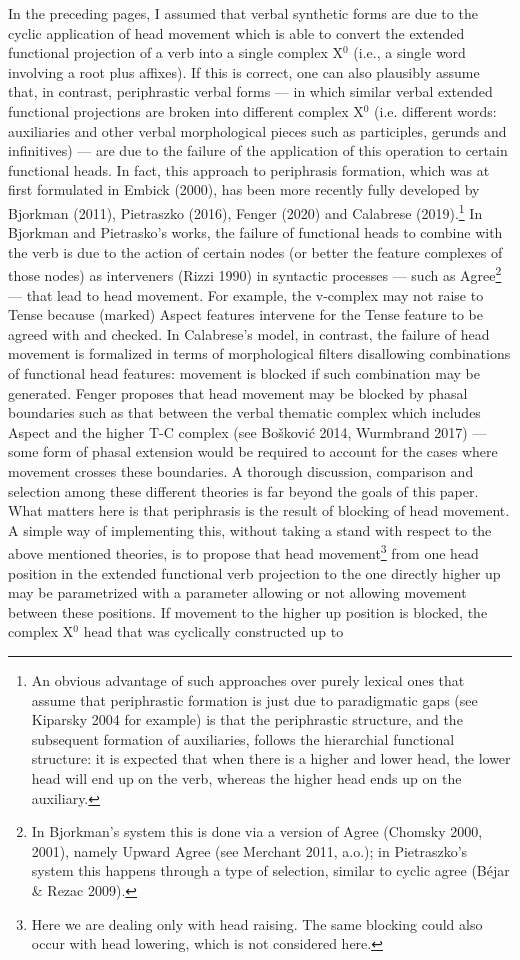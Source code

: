 \documentclass[output=paper,colorlinks,citecolor=brown,
]{langscibook}
\begin{document}
In the preceding pages, I assumed that verbal synthetic forms are due to the cyclic application of head movement which is able to convert the extended functional projection of a verb into a single complex X$^0$ (i.e., a single word involving a root plus affixes). If this is correct, one can also plausibly assume that, in contrast, periphrastic verbal forms — in which similar verbal extended functional projections are broken into different complex X$^0$ (i.e. different words: auxiliaries and other verbal morphological pieces such as participles, gerunds and infinitives) — are due to the failure of the application of this operation to certain functional heads. In fact, this approach to periphrasis formation, which was at first formulated in Embick (2000), has been more recently fully developed by Bjorkman (2011), Pietraszko (2016), Fenger (2020) and Calabrese (2019).\footnote{An obvious advantage of such approaches over purely lexical ones that assume that periphrastic formation is just due to paradigmatic gaps (see Kiparsky 2004 for example) is that the periphrastic structure, and the subsequent formation of auxiliaries, follows the hierarchial functional structure: it is expected that when there is a higher and lower head, the lower head will end up on the verb, whereas the higher head ends up on the auxiliary.}  In Bjorkman and Pietrasko’s works, the failure of functional heads to combine with the verb is due to the action of certain nodes (or better the feature complexes of those nodes) as interveners (Rizzi 1990) in syntactic processes — such as Agree\footnote{In Bjorkman’s system this is done via a version of Agree (Chomsky 2000, 2001), namely Upward Agree (see Merchant 2011, a.o.); in Pietraszko’s system this happens through a type of selection, similar to cyclic agree (Béjar \& Rezac 2009).}  — that lead to head movement. For example, the v-complex may not raise to Tense because (marked) Aspect features intervene for the Tense feature to be agreed with and checked. In Calabrese’s model, in contrast, the failure of head movement is formalized in terms of morphological filters disallowing combinations of functional head features: movement is blocked if such combination may be generated. Fenger proposes that head movement may be blocked by phasal boundaries such as that between the verbal thematic complex which includes Aspect and the higher T-C complex (see Bošković 2014, Wurmbrand 2017) — some form of phasal extension would be required to account for the cases where movement crosses these boundaries.  A thorough discussion, comparison and selection among these different theories is far beyond the goals of this paper.  What matters here is that periphrasis is the result of blocking of head movement. A simple way of implementing this, without taking a stand with respect to the above mentioned theories, is to propose that head movement\footnote{  Here we are dealing only with head raising. The same blocking could also occur with head lowering, which is not considered here.}  from one head position in the extended functional verb projection to the one directly higher up may be parametrized with a parameter allowing or not allowing movement between these positions. If movement to the higher up position is blocked, the complex X$^0$ head that was cyclically constructed up to 
\end{document}
